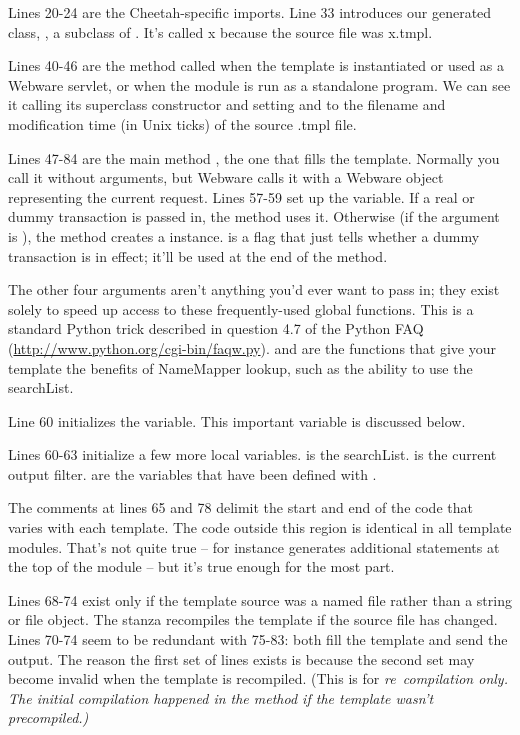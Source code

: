 Lines 20-24 are the Cheetah-specific imports.  Line 33 introduces our generated
class, , a subclass of .  It's called x because the
source file was x.tmpl.

Lines 40-46 are the  method called when the template is
instantiated or used as a Webware servlet, or when the module is run as a
standalone program.  We can see it calling its superclass constructor and
setting  and  to the filename and
modification time (in Unix ticks) of the source .tmpl file.

Lines 47-84 are the main method , the one that fills the
template.  Normally you call it without arguments, but Webware calls it with a
Webware  object representing the current request.  Lines
57-59 set up the  variable.  If a real or dummy transaction is
passed in, the method uses it.  Otherwise (if the  argument is
), the method creates a  instance.
 is a flag that just tells whether a dummy transaction is in
effect; it'll be used at the end of the method.  

The other four  arguments aren't anything you'd ever want to
pass in; they exist solely to speed up access to these frequently-used
global functions.  This is a standard Python trick described in question 4.7
of the Python FAQ (\url{http://www.python.org/cgi-bin/faqw.py}).
 and  are the functions that give your template the
benefits of NameMapper lookup, such as the ability to use the searchList.  

Line 60 initializes the  variable.  This important variable is
discussed below.  

Lines 60-63 initialize a few more local variables.   is the 
searchList.   is the current output filter.  
are the variables that have been defined with .

The comments at lines 65 and 78 delimit the start and end of the code that
varies with each template.  The code outside this region is identical in all
template modules.  That's not quite true --  for instance
generates additional  statements at the top of the module --
but it's true enough for the most part.

Lines 68-74 exist only if the template source was a named file rather than
a string or file object.  The stanza recompiles the template if the source
file has changed.  Lines 70-74 seem to be redundant with 75-83: both 
fill the template and send the output.  The reason the first set of lines
exists is because the second set may become invalid when the template is
recompiled.  (This is for \em{re}\ compilation only.  The initial compilation
happened in the  method if the template wasn't 
precompiled.)

